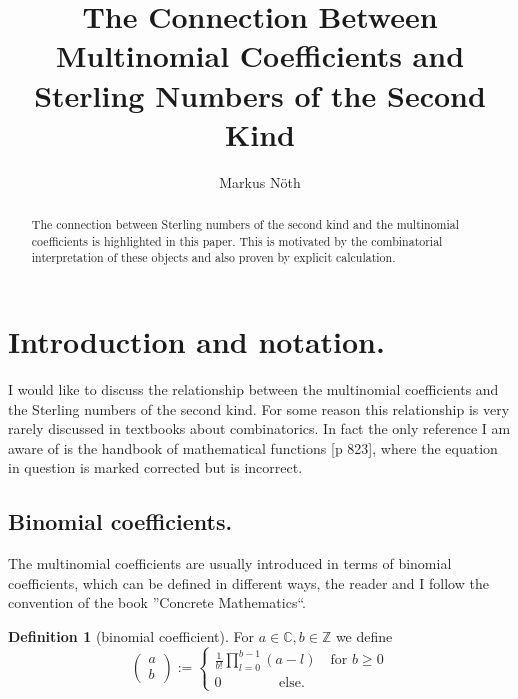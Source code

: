 \documentclass{article}
\theoremstyle{theorem}
\theoremstyle{definition}
\newtheorem*{definition}{Definition}
\begin{document}
\title{The Connection Between Multinomial Coefficients and Sterling Numbers of the Second Kind}
\author{Markus Nöth}

\maketitle

\begin{abstract}
The connection between Sterling numbers of the second kind and the multinomial coefficients is highlighted in this paper. 
This is motivated by the combinatorial interpretation of these objects and also proven by explicit calculation.
\end{abstract}


\noindent

\section{Introduction and notation.}

I would like to discuss the relationship between the multinomial coefficients and the Sterling numbers of the second kind.
For some reason this relationship is very rarely discussed in textbooks about combinatorics. In fact the only reference I
am aware of is the handbook of mathematical functions \cite{abramowitz1964handbook}[p 823], where the equation in 
question is marked corrected but is incorrect. 

\subsection{Binomial coefficients.}

The multinomial coefficients are usually introduced in terms of binomial coefficients, which can be defined in different ways,
the reader and I follow the convention of the book ''Concrete Mathematics``\cite{graham1994concrete}.

\begin{definition}[binomial coefficient]
For \(a\in\mathbb{C}, b\in\mathbb{Z}\) we define
\begin{equation}
\begin{pmatrix}a\\b\end{pmatrix} := \left\{\begin{matrix}
\frac{1}{b!}\prod_{l=0}^{b-1} (a-l) \quad \text{for } b\ge 0\\
0 \quad\quad\quad~~~~~  \text{else.}
\end{matrix} \right.
\end{equation}
\end{definition}
\end{document}
